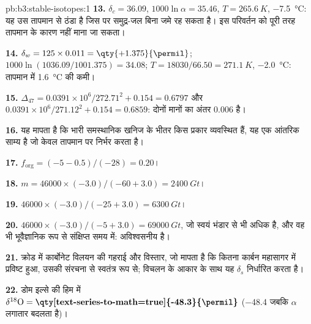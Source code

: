 \begin{solution}{pb:b3:stable-isotopes:1}
\textbf{13.} $\delta_c = 36.09$, $1000\ln\alpha = 35.46$, $T = \qty{265.6}{K}$,
\qty{-7.5}{\celsius}: यह उस तापमान से ठंडा है जिस पर समुद्र-जल बिना जमे रह सकता है।
इस परिवर्तन को पूरी तरह तापमान के कारण नहीं माना जा सकता।

\textbf{14.} $\delta_w = 125\times0.011 = \qty{+1.375}{\permil}$; $1000\ln(1036.09/1001.375)
= 34.08$; $T = 18030/66.50 = \qty{271.1}{K}$, \qty{-2.0}{\celsius}: तापमान में
\qty{1.6}{\celsius} की कमी।

\textbf{15.} $\Delta_{47} = 0.0391\times10^6/272.71^2 + 0.154 = 0.6797$ और
$0.0391\times10^6/271.12^2 + 0.154 = 0.6859$: दोनों मानों का अंतर
\qty{0.006}{\permil} है।

\textbf{16.} यह मापता है कि भारी समस्थानिक खनिज के भीतर
किस प्रकार व्यवस्थित हैं, यह एक आंतरिक साम्य है जो केवल तापमान पर निर्भर करता है।

\textbf{17.} $f_{\mathrm{org}} = (-5 - 0.5)/(-28) = 0.20$।

\textbf{18.} $m = 46000\times(-3.0)/(-60 + 3.0) = \qty{2400}{Gt}$।

\textbf{19.} $46000\times(-3.0)/(-25 + 3.0) = \qty{6300}{Gt}$।

\textbf{20.} $46000\times(-3.0)/(-5 + 3.0) = \qty{69000}{Gt}$, जो स्वयं भंडार
से भी अधिक है, और वह भी भूवैज्ञानिक रूप से संक्षिप्त समय में: अविश्वसनीय है।

\textbf{21.} क्रोड में कार्बोनेट विलयन की गहराई और विस्तार, जो
मापता है कि कितना कार्बन महासागर में प्रविष्ट हुआ, उसकी संरचना से स्वतंत्र रूप से;
विचलन के आकार के साथ यह $\delta_s$ निर्धारित करता है।

\textbf{22.} डोम इल्से की हिम में $\delta^{18}\mathrm O =
\textbf{\qty[text-series-to-math=true]{-48.3}{\permil}}$ (\qty{-48.4}{\permil}
जबकि $\alpha$ लगातार बदलता है)।
\end{solution}
